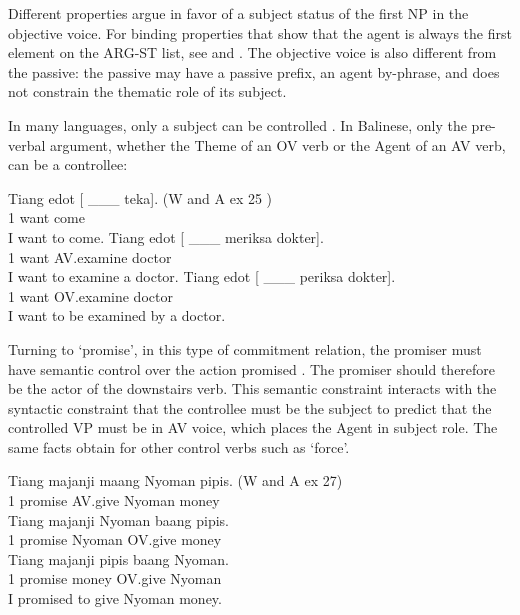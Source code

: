 \documentclass[output=paper]{langsci/langscibook}
\begin{document}
Different properties argue in favor of a subject status of the first NP in the objective voice. For binding properties that show that the agent is always the first element on the ARG-ST list, see \citet{WechslerandArka1998,ManningandSag1998} and . The objective voice is also different from the passive: the passive may have a passive prefix, an agent by-phrase, and does not constrain the thematic role of its subject.

In many languages, only a subject
can be controlled \citep{Zaenenetal1985}. In Balinese, only the pre-verbal argument, whether the Theme of an OV verb or the Agent of an AV verb, can be a controllee:

\begin{exe}
\ex \begin{xlist}
\ex \gll Tiang edot [ \_\_\_ teka]. (W and A ex 25 )\\
1 want come \\
\glt I want to come.
\ex \gll Tiang edot [ \_\_\_  meriksa dokter].\\
1 want AV.examine doctor\\
\glt I want to examine a doctor.
\ex \gll Tiang edot [ \_\_\_ periksa dokter].\\
1 want OV.examine doctor\\
\glt I want to be examined by a doctor.
\end{xlist}
\end{exe}

Turning to  ‘promise’, in this type of commitment relation, the promiser must have semantic control over the action promised \citet{Farkas1988,Kroeger1993,SagandPollard1991}. The promiser should therefore be the actor of the downstairs verb. This semantic constraint interacts with the syntactic constraint that the controllee must be the subject to predict that the controlled VP must be in AV voice, which places the Agent in subject role. The same facts obtain for other control verbs such as  ‘force’.

\begin{exe}
\ex \begin{xlist}
\ex \gll Tiang majanji maang Nyoman pipis. (W and A ex 27)\\
1 promise AV.give Nyoman money \\
\ex \gll *Tiang majanji Nyoman baang pipis. \\
1 promise Nyoman OV.give money \\
\ex \gll *Tiang majanji pipis baang Nyoman. \\
1 promise money OV.give Nyoman\\ 
\glt I promised to give Nyoman money. 
\end{xlist}
\end{exe}
\end{document}
